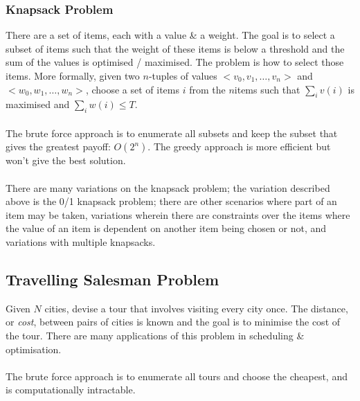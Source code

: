 \documentclass[a4paper,11pt]{article}
\begin{document}
\subsubsection{Knapsack Problem}
There are a set of items, each with a value \& a weight.
The goal is to select a subset of items such that the weight of these items is below a threshold and the sum of the values is optimised / maximised.
The problem is how to select those items.
More formally, given two $n$-tuples of values $< v_0, v_1, \dots, v_n>$ and $<w_0, w_1, \dots, w_n>$, choose a set of items $i$ from the $n$items such that $\sum_i v(i)$ is maximised and $\sum_iw(i) \leq T$.
\\\\
The brute force approach is to enumerate all subsets and keep the subset that gives the greatest payoff: $O(2^n)$.
The greedy approach is more efficient but won't give the best solution.
\\\\
There are many variations on the knapsack problem; the variation described above is the 0/1 knapsack problem;
there are other scenarios where part of an item may be taken, variations wherein there are constraints over the items where the value of an item is dependent on another item being chosen or not, and variations with multiple knapsacks.

\subsection{Travelling Salesman Problem}
Given $N$ cities, devise a tour that involves visiting every city once.
The distance, or \textit{cost}, between pairs of cities is known and the goal is to minimise the cost of the tour.
There are many applications of this problem in scheduling \& optimisation.
\\\\
The brute force approach is to enumerate all tours and choose the cheapest, and is computationally intractable.
\end{document}
